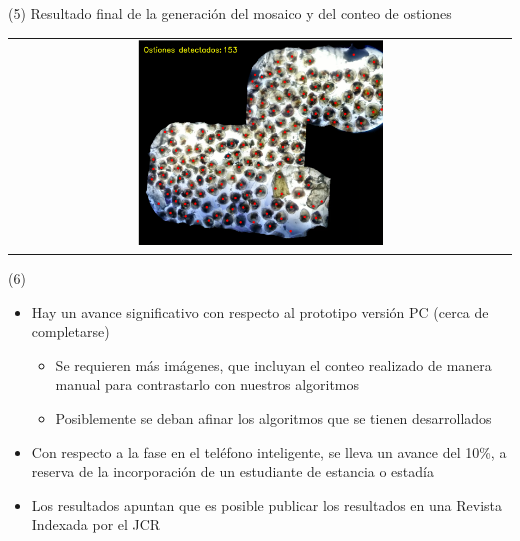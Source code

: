 \begin{frame}{ (5)}
Resultado final de la generación del mosaico y del conteo de ostiones
\begin{center}
 \begin{tabular}{c}
         \includegraphics[width=0.50\textwidth]{2022_ConteoOstioncitos/figs/ConteoOstionesFinal.png}\\
          \end{tabular}
\end{center}

\end{frame}



\begin{frame}{ (6)}

\begin{itemize}
\item Hay un avance significativo con respecto al prototipo versión PC (cerca de completarse)
\begin{itemize} 
\item Se requieren más imágenes, que incluyan el conteo realizado de manera manual para contrastarlo con nuestros algoritmos
\item Posiblemente se deban afinar los algoritmos que se tienen desarrollados
\end{itemize}
\item Con respecto a la fase en el teléfono inteligente, se lleva un avance del 10\%, a reserva de la incorporación de un estudiante de estancia o estadía
\item Los resultados apuntan que es posible publicar los resultados en una Revista Indexada por el JCR
\end{itemize}




\end{frame}



